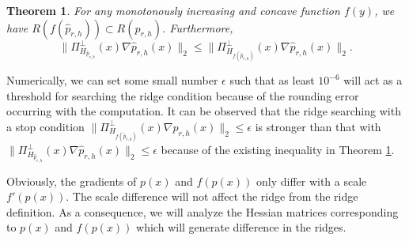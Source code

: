 \documentclass[aos,preprint]{imsart}
\newtheorem{theorem}{Theorem}[section]
\theoremstyle{remark}
\begin{document}
\begin{theorem}\label{inclusion}
For any monotonously increasing and concave function $f(y)$, we have $R({f(\hat{p}_{r,h})}) \subset R({\hat{p}_{r,h}})$. Furthermore, 
\[
\|\Pi_{H_{\hat{p}_{r,h}}}^\perp(x)\nabla \hat{p}_{r,h}(x)\|_2 \leq \|\Pi_{H_{f(\hat{p}_{r,h})}}^{\perp}(x)\nabla \hat{p}_{r,h}(x)\|_2.
\]
\end{theorem}

Numerically, we can set some small number $\epsilon$ such that as least $10^{-6}$ will act as a threshold for searching the ridge condition because of the rounding error occurring with the computation. It can be observed that the ridge searching with a stop condition $\|\Pi_{H_{f(\hat{p}_{r,h})}}^{\perp}(x)\nabla \hat{p}_{r,h}(x)\|_2\leq \epsilon$ is stronger than that with $\|\Pi_{H_{\hat{p}_{r,h}}}^\perp(x)\nabla \hat{p}_{r,h}(x)\|_2\leq \epsilon$ because of the existing inequality in Theorem \ref{inclusion}. 

Obviously, the gradients of $p(x)$ and $f(p(x))$ only differ with a scale $f'(p(x))$. The scale difference will not affect the ridge from the ridge definition. As a consequence, we will analyze the Hessian matrices corresponding to  $p(x)$ and $f(p(x))$ which will generate difference in the ridges.
\end{document}
